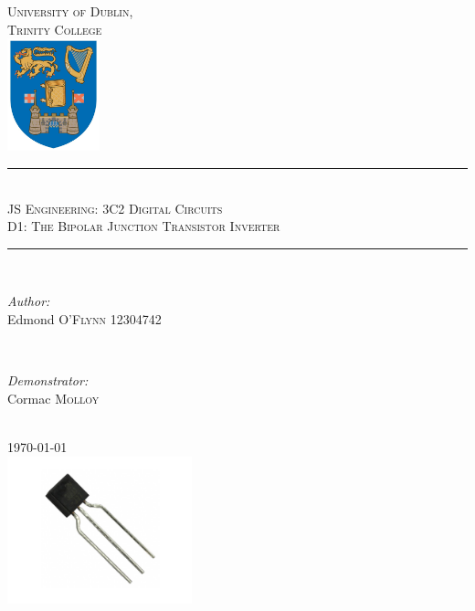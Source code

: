 \documentclass[12pt]{article}
\begin{document}
\begin{titlepage}

\newcommand{\HRule}{\rule{\linewidth}{0.5mm}}

\center
\textsc{\LARGE University of Dublin,\\Trinity College}\\[1.0cm]
\includegraphics[width=0.2\textwidth]{logo.png}

\HRule \\[0.4cm]
\textsc{\Large JS Engineering: 3C2 Digital Circuits}\\[0.25cm]
\textsc{\large D1: The Bipolar Junction Transistor Inverter}\\[0.1cm]
\HRule \\[0.4cm]
 
\begin{minipage}{0.5\textwidth}
\begin{flushleft} \large
\emph{Author:}
\\Edmond \textsc{O'Flynn} 12304742
\end{flushleft}
\end{minipage}
~
\begin{minipage}{0.4\textwidth}
\begin{flushleft} 
\large
\emph{Demonstrator:} \\
Cormac \textsc{Molloy} 
\end{flushleft}
\end{minipage}\\[3cm]

{\large \today}\\[2cm] 

\includegraphics[width=0.4\textwidth]{bjt.JPG}
\clearpage
\end{titlepage}
\end{document}

